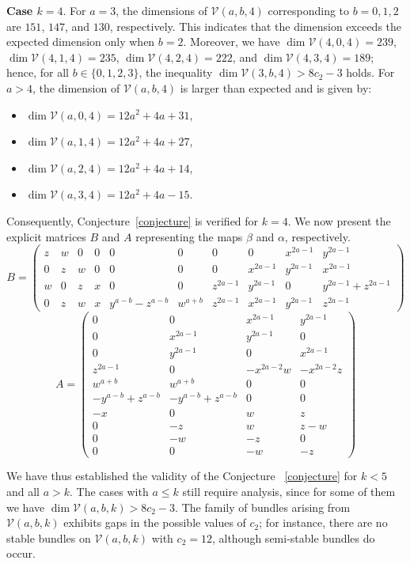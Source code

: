 \documentclass[twoside,reqno]{amsart}
\theoremstyle{plain}
\begin{document}
\textbf{Case $k=4$}. For $a=3$, the dimensions of $\mathcal{V}(a,b,4)$ corresponding to $b=0,1,2$ are $151$, $147$, and $130$, respectively. This indicates that the dimension exceeds the expected dimension only when $b=2$. Moreover, we have $\dim\mathcal{V}(4,0,4)=239$, $\dim\mathcal{V}(4,1,4)=235$, $\dim\mathcal{V}(4,2,4)=222$, and $\dim\mathcal{V}(4,3,4)=189$; hence, for all $b\in\{0,1,2,3\}$, the inequality $\dim\mathcal{V}(3,b,4) > 8c_2-3$ holds. For $a>4$, the dimension of $\mathcal{V}(a,b,4)$ is larger than expected and is given by:
\begin{itemize}
    \item $\dim \mathcal{V}(a,0,4)=12a^{2}+4a+31$,
    \item $\dim \mathcal{V}(a,1,4)=12a^{2}+4a+27$,
    \item $\dim \mathcal{V}(a,2,4)=12a^{2}+4a+14$,
    \item $\dim \mathcal{V}(a,3,4)=12a^{2}+4a-15$.
\end{itemize}
Consequently, Conjecture~\ref{conjecture} is verified for $k=4$. We now present the explicit matrices $B$ and $A$ representing the maps $\beta$ and $\alpha$, respectively.
$$ B=\begin{pmatrix}
   z & w & 0 & 0 & 0 & 0 & 0 & 0 & x^{2a-1} & y^{2a-1} \\
    0 & z & w & 0 & 0 & 0 & 0 & x^{2a-1} & y^{2a-1} & x^{2a-1} \\
    w & 0 & z & x & 0 & 0 & z^{2a-1} & y^{2a-1} & 0 & y^{2a-1}+z^{2a-1} \\
    0 & z & w & x & y^{a-b}-z^{a-b} & w^{a+b} & z^{2a-1} & x^{2a-1} & y^{2a-1} & z^{2a-1}
\end{pmatrix}$$
$$A= \begin{pmatrix}
   0 & 0 & x^{2a-1} & y^{2a-1} \\
   0 & x^{2a-1} & y^{2a-1} & 0 \\
 0 & y^{2a-1} & 0 & x^{2a-1} \\
    z^{2a-1} & 0 & -x^{2a-2}w & -x^{2a-2}z \\
    w^{a+b} & w^{a+b} & 0 & 0 \\
    -y^{a-b}+z^{a-b} & -y^{a-b}+z^{a-b} & 0 & 0 \\
    -x & 0 & w & z \\
    0 & -z & w & z-w \\
    0 & -w & -z & 0 \\
    0 & 0 & -w & -z
\end{pmatrix}$$ 

We have thus established the validity of the Conjecture ~\ref{conjecture} for $k<5$ and all $a>k$. The cases with $a \leq k$ still require analysis, since for some of them we have $\dim \mathcal{V}(a,b,k) > 8c_2-3$. The family of bundles arising from $\mathcal{V}(a,b,k)$ exhibits gaps in the possible values of $c_2$; for instance, there are no stable bundles on $\mathcal{V}(a,b,k)$ with $c_2=12$, although semi-stable bundles do occur.

    














\end{document}
